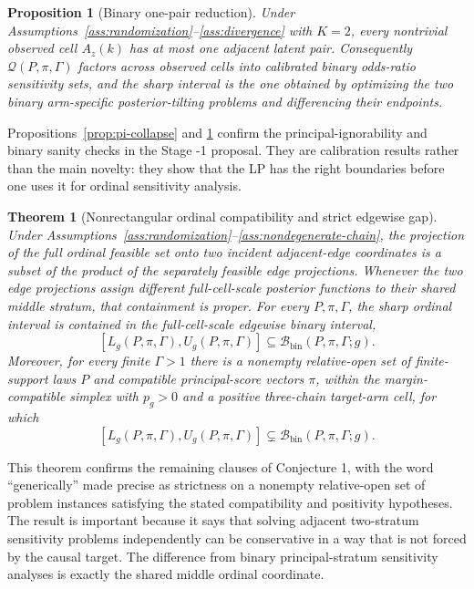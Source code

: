 \documentclass[11pt]{article}
\theoremstyle{definition}
\theoremstyle{plain}
\newtheorem{theorem}{Theorem}
\newtheorem{proposition}{Proposition}
\theoremstyle{remark}
\begin{document}
\begin{proposition}[Binary one-pair reduction]\label{prop:binary-reduction}
Under Assumptions~\ref{ass:randomization}--\ref{ass:divergence} with \(K=2\),
every nontrivial observed cell \(A_z(k)\) has at most one adjacent latent pair.
Consequently \(\mathcal Q(P,\pi,\Gamma)\) factors across observed cells into
calibrated binary odds-ratio sensitivity sets, and the sharp interval is the
one obtained by optimizing the two binary arm-specific posterior-tilting
problems and differencing their endpoints.
\end{proposition}

Propositions~\ref{prop:pi-collapse} and \ref{prop:binary-reduction} confirm the
principal-ignorability and binary sanity checks in the Stage -1 proposal.  They
are calibration results rather than the main novelty: they show that the LP
has the right boundaries before one uses it for ordinal sensitivity analysis.

\begin{theorem}[Nonrectangular ordinal compatibility and strict edgewise gap]\label{thm:nonrectangular}
Under Assumptions~\ref{ass:randomization}--\ref{ass:nondegenerate-chain}, the
projection of the full ordinal feasible set onto two incident adjacent-edge
coordinates is a subset of the product of the separately feasible edge
projections.  Whenever the two edge projections assign different
full-cell-scale posterior functions to their shared middle stratum, that
containment is proper.  For every \(P,\pi,\Gamma\), the sharp ordinal interval
is contained in the full-cell-scale edgewise binary interval,
\[
  [L_g(P,\pi,\Gamma),U_g(P,\pi,\Gamma)]
  \subseteq
  \mathcal B_{\mathrm{bin}}(P,\pi,\Gamma;g).
\]
Moreover, for every finite \(\Gamma>1\) there is a nonempty relative-open set
of finite-support laws \(P\) and compatible principal-score vectors \(\pi\),
within the margin-compatible simplex with \(p_g>0\) and a positive three-chain
target-arm cell, for which
\[
  [L_g(P,\pi,\Gamma),U_g(P,\pi,\Gamma)]
  \subsetneq
  \mathcal B_{\mathrm{bin}}(P,\pi,\Gamma;g).
\]
\end{theorem}

This theorem confirms the remaining clauses of Conjecture 1, with the word
``generically'' made precise as strictness on a nonempty relative-open set of
problem instances satisfying the stated compatibility and positivity
hypotheses.  The
result is important because it says that solving adjacent two-stratum
sensitivity problems independently can be conservative in a way that is not
forced by the causal target.  The difference from binary principal-stratum
sensitivity analyses is exactly the shared middle ordinal coordinate.
\end{document}

